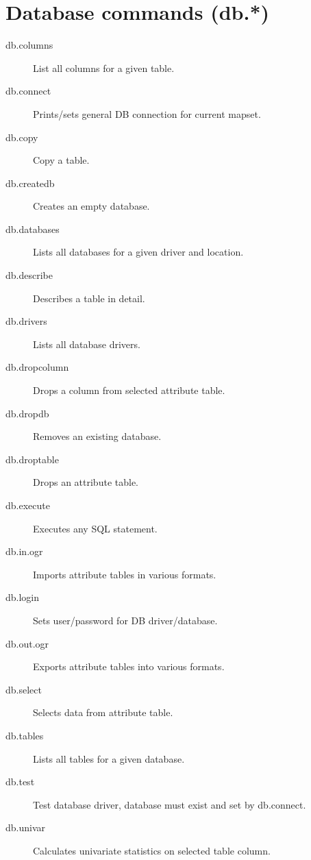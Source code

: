 
\section{Database commands (db.{*})}
\begin{description}
\item [{db.columns}] List all columns for a given table.
\item [{db.connect}] Prints/sets general DB connection for current mapset.
\item [{db.copy}] Copy a table.
\item [{db.createdb}] Creates an empty database.
\item [{db.databases}] Lists all databases for a given driver and location.
\item [{db.describe}] Describes a table in detail.
\item [{db.drivers}] Lists all database drivers.
\item [{db.dropcolumn}] Drops a column from selected attribute table.
\item [{db.dropdb}] Removes an existing database.
\item [{db.droptable}] Drops an attribute table.
\item [{db.execute}] Executes any SQL statement.
\item [{db.in.ogr}] Imports attribute tables in various formats.
\item [{db.login}] Sets user/password for DB driver/database.
\item [{db.out.ogr}] Exports attribute tables into various formats.
\item [{db.select}] Selects data from attribute table.
\item [{db.tables}] Lists all tables for a given database.
\item [{db.test}] Test database driver, database must exist and set by
db.connect.
\item [{db.univar}] Calculates univariate statistics on selected table
column.\end{description}

